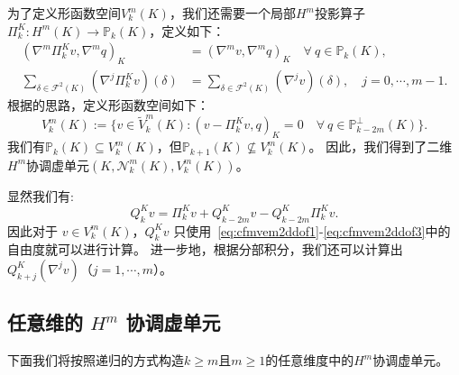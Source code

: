 为了定义形函数空间$V_k^m(K)$，我们还需要一个局部$H^m$投影算子$\Pi_k^K: H^m(K)\to\mathbb P_k(K)$，定义如下：
\begin{align}
(\nabla^m\Pi_k^Kv, \nabla^mq)_K&=(\nabla^mv, \nabla^mq)_K\quad  \forall~q\in \mathbb P_k(K),\label{eq:projlocal2d1}\\
\sum_{\delta\in\mathcal F^{2}(K)}(\nabla^{j}\Pi_k^Kv)(\delta)&=\sum_{\delta\in\mathcal F^{2}(K)}(\nabla^{j}v)(\delta), \quad j=0,\cdots, m-1.\label{eq:projlocal2d2}
\end{align}
根据\cite{AhmadAlsaediBrezziMariniEtAl2013,ChenHuang2020}的思路，定义形函数空间如下：
$$
V_k^m(K):=\{v\in \widetilde{V}_k^m(K): (v-\Pi_k^Kv,
q)_K=0\quad\forall~q\in\mathbb P_{k-2m}^{\perp}(K)\}.
$$
我们有$\mathbb P_k(K)\subseteq V_k^m(K)$，但$\mathbb P_{k+1}(K)\not\subseteq V_k^m(K)$。
因此，我们得到了二维$H^m$协调虚单元$(K, \mathcal N_k^m(K), V_k^m(K))$。

显然我们有:
$$
Q_k^Kv= \Pi_k^Kv + Q_{k-2m}^Kv-Q_{k-2m}^K\Pi_k^Kv.
$$
因此对于 $v\in V_k^m(K)$，$Q_k^Kv$
只使用~\eqref{eq:cfmvem2ddof1}-\eqref{eq:cfmvem2ddof3}中的自由度就可以进行计算。
进一步地，根据分部积分，我们还可以计算出$Q_{k+j}^K(\nabla^jv)$（$j=1, \cdots,
m$）。

\subsection{任意维的 $H^m$ 协调虚单元}

下面我们将按照递归的方式构造$k\geq m$且$m\geq1$的任意维度中的$H^m$协调虚单元。

